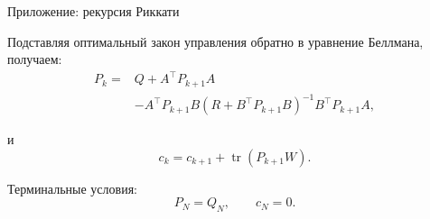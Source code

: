 \documentclass{beamer}
\begin{document}
	\begin{frame}{Приложение: рекурсия Риккати}
		\begin{flushleft}
			
			Подставляя оптимальный закон управления обратно в уравнение Беллмана,
			получаем:
			\[
			\begin{aligned}
				P_k={}&Q+A^\top P_{k+1}A\\
				&-A^\top P_{k+1}B
				(R+B^\top P_{k+1}B)^{-1}
				B^\top P_{k+1}A,
			\end{aligned}
			\]
			
			и
			\[
			c_k=c_{k+1}+\operatorname{tr}(P_{k+1}W).
			\]
			
			Терминальные условия:
			\[
			P_N=Q_N,\qquad c_N=0.
			\]
			
		\end{flushleft}
	\end{frame}
	
	
	
	
	
\end{document}
